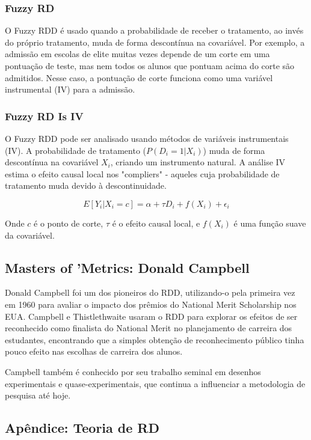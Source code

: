 \documentclass[a4paper,12pt]{article}[abntex2]
\begin{document}
\subsubsection*{Fuzzy RD}

O Fuzzy RDD é usado quando a probabilidade de receber o tratamento, ao invés do próprio tratamento, muda de forma descontínua na covariável. Por exemplo, a admissão em escolas de elite muitas vezes depende de um corte em uma pontuação de teste, mas nem todos os alunos que pontuam acima do corte são admitidos. Nesse caso, a pontuação de corte funciona como uma variável instrumental (IV) para a admissão.

\subsubsection*{Fuzzy RD Is IV}

O Fuzzy RDD pode ser analisado usando métodos de variáveis instrumentais (IV). A probabilidade de tratamento (\(P(D_i = 1 | X_i)\)) muda de forma descontínua na covariável \(X_i\), criando um instrumento natural. A análise IV estima o efeito causal local nos "compliers" - aqueles cuja probabilidade de tratamento muda devido à descontinuidade.

\begin{equation}
    E[Y_i | X_i = c] = \alpha + \tau D_i + f(X_i) + \epsilon_i
\end{equation}

Onde \(c\) é o ponto de corte, \(\tau\) é o efeito causal local, e \(f(X_i)\) é uma função suave da covariável.

\subsection*{Masters of 'Metrics: Donald Campbell}

Donald Campbell foi um dos pioneiros do RDD, utilizando-o pela primeira vez em 1960 para avaliar o impacto dos prêmios do National Merit Scholarship nos EUA. Campbell e Thistlethwaite usaram o RDD para explorar os efeitos de ser reconhecido como finalista do National Merit no planejamento de carreira dos estudantes, encontrando que a simples obtenção de reconhecimento público tinha pouco efeito nas escolhas de carreira dos alunos.

Campbell também é conhecido por seu trabalho seminal em desenhos experimentais e quase-experimentais, que continua a influenciar a metodologia de pesquisa até hoje.

\subsection*{Apêndice: Teoria de RD}
\end{document}
